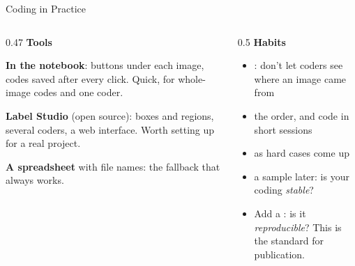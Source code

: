 \begin{frame}{Coding in Practice}
\begin{columns}[T]
\begin{column}{0.47\textwidth}
\textbf{Tools}

\vspace{0.1cm}
\begin{graybox}
\textbf{In the notebook}: buttons under each image, codes saved after every click. Quick, for
whole-image codes and one coder.
\end{graybox}
\begin{graybox}
\textbf{Label Studio} (open source): boxes and regions, several coders, a web interface. Worth
setting up for a real project.
\end{graybox}
\begin{graybox}
\textbf{A spreadsheet} with file names: the fallback that always works.
\end{graybox}
\end{column}
\begin{column}{0.5\textwidth}
\textbf{Habits}
\begin{itemize}
\item {}: don't let coders see where an image came from
\item {} the order, and code in short sessions
\item {} as hard cases come up
\item {} a sample later: is your coding \emph{stable}?
\item Add a : is it \emph{reproducible}? This is the standard for
      publication.
\end{itemize}
\end{column}
\end{columns}
\end{frame}

